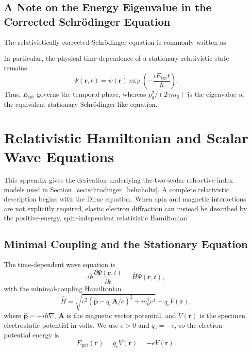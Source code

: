 


\subsection{A Note on the Energy Eigenvalue in the Corrected Schrödinger Equation}
\label{app:corrected_schrodinger_eigenvalue}

The relativistically corrected Schrödinger equation is commonly written as



In particular, the physical time dependence of a stationary relativistic
state remains
\begin{equation}
\Psi(\mathbf r,t)
=
\psi(\mathbf r)
\exp\left(-\frac{iE_{\mathrm{tot}}t}{\hbar}\right).
\end{equation}
Thus, $E_{\mathrm{tot}}$ governs the temporal phase, whereas
$p_0^2/(2\gamma m_0)$ is the eigenvalue of the equivalent stationary
Schrödinger-like equation.



\section{Relativistic Hamiltonian and Scalar Wave Equations}
\label{app:relativistic_hamiltonian}

This appendix gives the derivation underlying the two scalar refractive-index
models used in Section~\ref{sec:schrodinger_helmholtz}. A complete relativistic
description begins with the Dirac equation. When spin and magnetic interactions
are not explicitly required, elastic electron diffraction can instead be
described by the positive-energy, spin-independent relativistic Hamiltonian
\cite{fujiwara1961relativistic,kirkland2010advanced}.

\subsection{Minimal Coupling and the Stationary Equation}

The time-dependent wave equation is
\begin{equation}
i\hbar\frac{\partial\Psi(\mathbf r,t)}{\partial t}
=
\hat H\Psi(\mathbf r,t),
\label{eq:app_time_dependent_wave_equation}
\end{equation}
with the minimal-coupling Hamiltonian
\begin{equation}
\hat H
=
\sqrt{
c^2\left(\hat{\mathbf p}-q_e\mathbf A/c\right)^2+m_0^2c^4
}
+
q_eV(\mathbf r),
\label{eq:app_minimal_coupling_hamiltonian}
\end{equation}
where $\hat{\mathbf p}=-i\hbar\nabla$, $\mathbf A$ is the magnetic vector
potential, and $V(\mathbf r)$ is the specimen electrostatic potential in
volts. We use $e>0$ and $q_e=-e$, so the electron potential energy is
\begin{equation}
E_{\mathrm{pot}}(\mathbf r)
=
q_eV(\mathbf r)
=
-eV(\mathbf r).
\label{eq:app_electron_potential_energy}
\end{equation}


